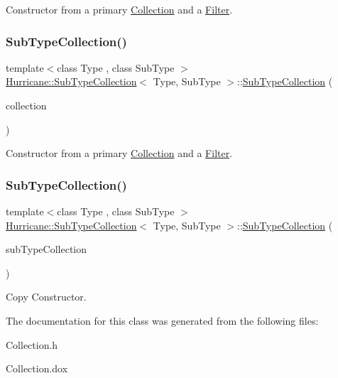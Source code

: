 Constructor from a primary \mbox{\hyperlink{classHurricane_1_1Collection}{Collection}} and a \mbox{\hyperlink{classHurricane_1_1Filter}{Filter}}. \mbox{\label{classHurricane_1_1SubTypeCollection_a09df045ff335493ac3068a865b793291}} 
\subsubsection{\texorpdfstring{Sub\+Type\+Collection()}{SubTypeCollection()}\hspace{0.1cm}{\footnotesize\ttfamily [2/3]}}
{\footnotesize\ttfamily template$<$class Type , class Sub\+Type $>$ \\
\mbox{\hyperlink{classHurricane_1_1SubTypeCollection}{Hurricane\+::\+Sub\+Type\+Collection}}$<$ Type, Sub\+Type $>$\+::\mbox{\hyperlink{classHurricane_1_1SubTypeCollection}{Sub\+Type\+Collection}} (\begin{DoxyParamCaption}\item[{const \mbox{\hyperlink{classHurricane_1_1GenericCollection}{Generic\+Collection}}$<$ Type $>$ \&}]{collection }\end{DoxyParamCaption})\hspace{0.3cm}{\ttfamily [inline]}}

Constructor from a primary \mbox{\hyperlink{classHurricane_1_1Collection}{Collection}} and a \mbox{\hyperlink{classHurricane_1_1Filter}{Filter}}. \mbox{\label{classHurricane_1_1SubTypeCollection_a5c223a20f42ebb72d8d4be5ee99bb2d8}} 
\subsubsection{\texorpdfstring{Sub\+Type\+Collection()}{SubTypeCollection()}\hspace{0.1cm}{\footnotesize\ttfamily [3/3]}}
{\footnotesize\ttfamily template$<$class Type , class Sub\+Type $>$ \\
\mbox{\hyperlink{classHurricane_1_1SubTypeCollection}{Hurricane\+::\+Sub\+Type\+Collection}}$<$ Type, Sub\+Type $>$\+::\mbox{\hyperlink{classHurricane_1_1SubTypeCollection}{Sub\+Type\+Collection}} (\begin{DoxyParamCaption}\item[{const \mbox{\hyperlink{classHurricane_1_1SubTypeCollection}{Sub\+Type\+Collection}}$<$ Type, Sub\+Type $>$ \&}]{sub\+Type\+Collection }\end{DoxyParamCaption})\hspace{0.3cm}{\ttfamily [inline]}}

Copy Constructor. 

The documentation for this class was generated from the following files\+:\begin{DoxyCompactItemize}
\item 
Collection.\+h\item 
Collection.\+dox\end{DoxyCompactItemize}
